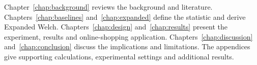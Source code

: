 Chapter~\ref{chap:background} reviews the background and literature.
Chapters~\ref{chap:baselines} and~\ref{chap:expanded} define the statistic
and derive Expanded Welch. Chapters~\ref{chap:design} and~\ref{chap:results}
present the experiment, results and online-shopping application.
Chapters~\ref{chap:discussion} and~\ref{chap:conclusion} discuss the
implications and limitations. The appendices give supporting calculations,
experimental settings and additional results.

